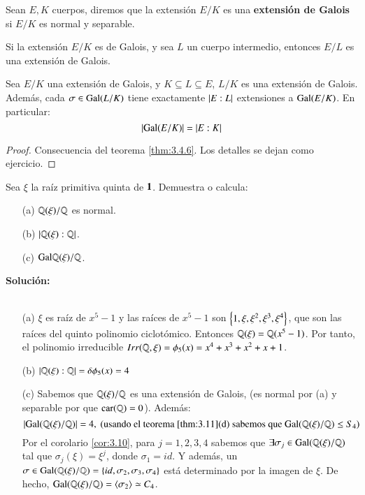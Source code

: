 \begin{dfn}
    Sean $E, K$ cuerpos, diremos que la extensión $E/K$ es una \textbf{extensión de Galois} si $E/K$ es normal y separable.
\end{dfn}
\begin{obs}
    Si la extensión $E/K$ es de Galois, y sea $L$ un cuerpo intermedio, entonces $E/L$ es una extensión de Galois.
\end{obs}

\begin{cor}\label{cor:3.4.7}
    Sea $E/K$ una extensión de Galois, y $K \subseteq L \subseteq E$, $L/K$ es una extensión de Galois. Además, cada $\sigma \in \mathrm{Gal}(L/K)$ tiene exactamente $\left|E:L\right|$ extensiones a $\mathrm{Gal}(E/K)$. En particular:
    $$
        \left|\mathrm{Gal}(E/K)\right| = \left|E:K\right|
    $$
\end{cor}
\begin{proof}
    Consecuencia del teorema \ref{thm:3.4.6}. Los detalles se dejan como ejercicio.
\end{proof}

\begin{ex}[H3.7]
    Sea $\xi$ la raíz primitiva quinta de $\mathbf{1}$. Demuestra o calcula:
    \begin{itemize}
        \item[(a)] $\mathbb{Q}(\xi)/\mathbb{Q}$ es normal.
        \item[(b)] $\left|\mathbb{Q}(\xi):\mathbb{Q}\right|$.
        \item[(c)] $\mathrm{Gal}{\mathbb{Q}(\xi)/\mathbb{Q}}$.
    \end{itemize}

    \textbf{Solución:}\\\\
    \begin{itemize}
        \item[(a)] $\xi$ es raíz de $x^5 - 1$ y las raíces de $x^5 - 1$ son $\left\{1, \xi, \xi^2, \xi^3, \xi^4\right\}$, que son las raíces del quinto polinomio ciclotómico. Entonces $\mathbb{Q}(\xi) = \mathbb{Q}(x^5 - 1)$. Por tanto, el polinomio irreducible $Irr(\mathbb{Q}, \xi) = \phi_5(x) = x^4 + x^3 + x^2 + x + 1$.
        \item[(b)] $\left|\mathbb{Q}(\xi):\mathbb{Q}\right| = \delta \phi_5(x) = 4$
        \item[(c)] Sabemos que $\mathbb{Q}(\xi)/\mathbb{Q}$ es una extensión de Galois, (es normal por (a)  y separable por que $\mathrm{car}(\mathbb{Q}) = 0$). Además:
        $$
            \left|\mathrm{Gal}(\mathbb{Q}(\xi)/\mathbb{Q})\right| = 4, \text{ (usando el teorema \ref{thm:3.11}(d) sabemos que } \mathrm{Gal}(\mathbb{Q}(\xi)/\mathbb{Q}) \leq S_4 \text{)}
        $$
        Por el corolario \ref{cor:3.10}, para $j = 1, 2, 3, 4$ sabemos que $\exists \sigma_j \in \mathrm{Gal}(\mathbb{Q}(\xi)/\mathbb{Q})$ tal que $\sigma_j(\xi) = \xi^j$, donde $\sigma_1 = id$. Y además, un $\sigma \in \mathrm{Gal}(\mathbb{Q}(\xi)/\mathbb{Q}) = \left\{id, \sigma_2, \sigma_3, \sigma_4\right\}$ está determinado por la imagen de $\xi$. De hecho, $\mathrm{Gal}(\mathbb{Q}(\xi)/\mathbb{Q}) = \langle\sigma_2\rangle \simeq C_4$.
    \end{itemize}
\end{ex}

